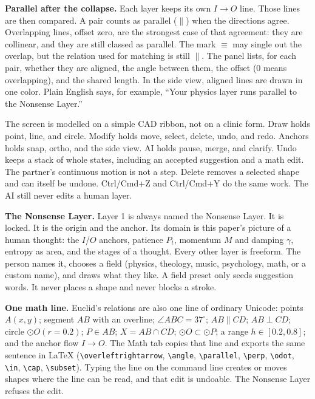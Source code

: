 \documentclass[11pt]{article}
\begin{document}
\textbf{Parallel after the collapse.} Each layer keeps its own \(I\to O\) line. Those lines are then compared. A pair counts as parallel (\(\parallel\)) when the directions agree. Overlapping lines, offset zero, are the strongest case of that agreement: they are collinear, and they are still classed as parallel. The mark \(\equiv\) may single out the overlap, but the relation used for matching is still \(\parallel\). The panel lists, for each pair, whether they are aligned, the angle between them, the offset (0 means overlapping), and the shared length. In the side view, aligned lines are drawn in one color. Plain English says, for example, ``Your physics layer runs parallel to the Nonsense Layer.''

The screen is modelled on a simple CAD ribbon, not on a clinic form. Draw holds point, line, and circle. Modify holds move, select, delete, undo, and redo. Anchors holds snap, ortho, and the side view. AI holds pause, merge, and clarify. Undo keeps a stack of whole states, including an accepted suggestion and a math edit. The partner's continuous motion is not a step. Delete removes a selected shape and can itself be undone. Ctrl/Cmd+Z and Ctrl/Cmd+Y do the same work. The AI still never edits a human layer.

\textbf{The Nonsense Layer.} Layer 1 is always named the Nonsense Layer. It is locked. It is the origin and the anchor. Its domain is this paper's picture of a human thought: the $I$/$O$ anchors, patience $P_t$, momentum $M$ and damping $\gamma$, entropy as area, and the stages of a thought. Every other layer is freeform. The person names it, chooses a field (physics, theology, music, psychology, math, or a custom name), and draws what they like. A field preset only seeds suggestion words. It never places a shape and never blocks a stroke.

\textbf{One math line.} Euclid's relations are also one line of ordinary Unicode: points $A(x,y)$; segment $AB$ with an overline; $\angle ABC = 37^\circ$; $AB \parallel CD$; $AB \perp CD$; circle $\odot O(r=0.2)$; $P \in AB$; $X = AB \cap CD$; $\odot O \subset \odot P$; a range $h \in [0.2,0.8]$; and the anchor flow $I \to O$. The Math tab copies that line and exports the same sentence in LaTeX (\texttt{\textbackslash overleftrightarrow}, \texttt{\textbackslash angle}, \texttt{\textbackslash parallel}, \texttt{\textbackslash perp}, \texttt{\textbackslash odot}, \texttt{\textbackslash in}, \texttt{\textbackslash cap}, \texttt{\textbackslash subset}). Typing the line on the command line creates or moves shapes where the line can be read, and that edit is undoable. The Nonsense Layer refuses the edit.
\end{document}
